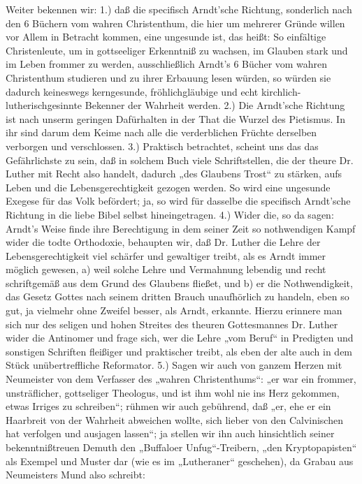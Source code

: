 Weiter bekennen wir: 1.) daß die specifisch Arndt’sche Richtung, sonderlich nach den 6 Büchern vom
wahren Christenthum, die hier um mehrerer Gründe willen vor Allem in Betracht kommen, eine ungesunde ist,
das heißt: So einfältige Christenleute, um in gottseeliger Erkenntniß zu wachsen, im Glauben stark
und im Leben frommer zu werden, ausschließlich Arndt’s 6 Bücher vom wahren Christenthum studieren
und zu ihrer Erbauung lesen würden, so würden sie dadurch keineswegs kerngesunde, fröhlichgläubige
und echt kirchlich-lutherischgesinnte Bekenner der Wahrheit werden. 2.) Die Arndt’sche Richtung ist
nach unserm geringen Dafürhalten in der That die Wurzel des Pietismus. In ihr sind darum dem Keime nach
alle die verderblichen Früchte derselben verborgen und verschlossen. 3.) Praktisch
betrachtet, scheint uns das das Gefährlichste zu sein, daß in solchem Buch viele
Schriftstellen, die der theure Dr. Luther mit Recht also handelt, dadurch „des Glaubens Trost“
zu stärken, aufs Leben und die Lebensgerechtigkeit gezogen werden. So wird eine ungesunde Exegese
für das Volk befördert; ja, so wird für dasselbe die specifisch Arndt’sche Richtung in die liebe
Bibel selbst hineingetragen. 4.) Wider die, so da sagen: Arndt’s Weise finde ihre Berechtigung in dem
seiner Zeit so nothwendigen Kampf wider die todte Orthodoxie, behaupten wir, daß Dr. Luther die Lehre
der Lebensgerechtigkeit viel schärfer und gewaltiger treibt, als es Arndt immer möglich gewesen, a)
weil solche Lehre und Vermahnung lebendig und recht schriftgemäß aus dem Grund des Glaubens fließet,
und b) er die Nothwendigkeit, das Gesetz Gottes nach seinem dritten Brauch unaufhörlich zu handeln,
eben so gut, ja vielmehr ohne Zweifel besser, als Arndt, erkannte. Hierzu erinnere man sich nur des
seligen und hohen Streites des theuren Gottesmannes Dr. Luther wider die Antinomer und frage sich,
wer die Lehre „vom Beruf“ in Predigten und sonstigen Schriften fleißiger und praktischer treibt,
als eben der alte auch in dem Stück unübertreffliche Reformator. 5.) Sagen wir auch von ganzem Herzen
mit Neumeister von dem Verfasser des „wahren Christenthums“: „er war ein frommer, unsträflicher,
gottseliger Theologus, und ist ihm wohl nie ins Herz gekommen, etwas Irriges zu schreiben“; rühmen
wir auch gebührend, daß „er, ehe er ein Haarbreit von der Wahrheit abweichen wollte, sich lieber
von den Calvinischen hat verfolgen und ausjagen lassen“; ja stellen wir ihn auch hinsichtlich seiner
bekenntnißtreuen Demuth den „Buffaloer Unfug“-Treibern, „den Kryptopapisten“ als Exempel
und Muster dar (wie es im „Lutheraner“ geschehen), da Grabau aus Neumeisters Mund also schreibt:
